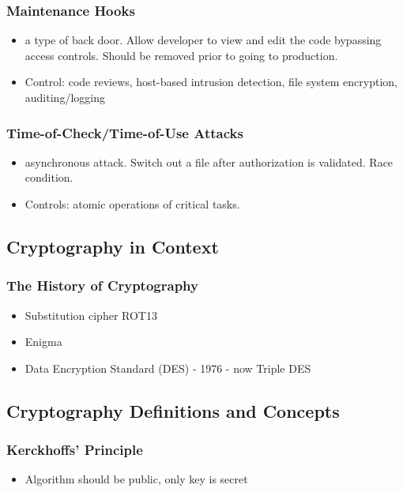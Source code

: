 \documentclass[11pt]{article}
\begin{document}
\subsubsection{Maintenance Hooks}
\label{sec:org33a5090}
\begin{itemize}
\item a type of back door. Allow developer to view and edit the code bypassing access controls. Should be removed prior to going to production.
\item Control: code reviews, host-based intrusion detection, file system encryption, auditing/logging
\end{itemize}
\subsubsection{Time-of-Check/Time-of-Use Attacks}
\label{sec:org905565c}
\begin{itemize}
\item asynchronous attack. Switch out a file after authorization is validated. Race condition.
\item Controls: atomic operations of critical tasks.
\end{itemize}
\subsection{Cryptography in Context}
\label{sec:org644f663}
\subsubsection{The History of Cryptography}
\label{sec:org0c4755f}
\begin{itemize}
\item Substitution cipher ROT13
\item Enigma
\item Data Encryption Standard (DES) - 1976 - now Triple DES
\end{itemize}
\subsection{Cryptography Definitions and Concepts}
\label{sec:org5f48831}
\subsubsection{Kerckhoffs' Principle}
\label{sec:org1ce9bd2}
\begin{itemize}
\item Algorithm should be public, only key is secret
\end{itemize}
\end{document}
